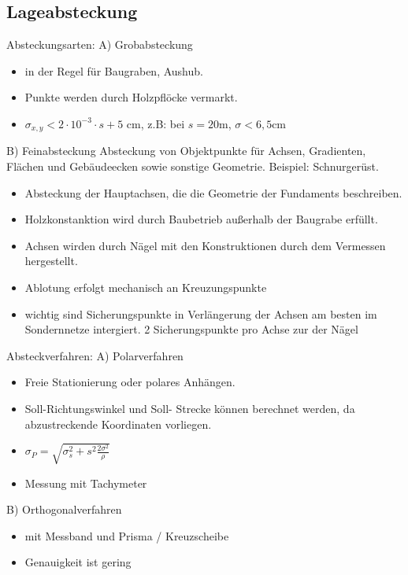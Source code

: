 \documentclass[12pt]{article}
\begin{document}
\subsection{Lageabsteckung}
Absteckungsarten: \newline
A) Grobabsteckung
\begin{itemize}
\item in der Regel für Baugraben, Aushub.
\item Punkte werden durch Holzpflöcke vermarkt.
\item $\sigma_{x,y} < 2 \cdot 10^{-3} \cdot s + 5$ cm, z.B: bei $s=20$m, $\sigma<6,5$cm
\end{itemize}
B) Feinabsteckung \newline
Absteckung von Objektpunkte für Achsen, Gradienten, Flächen und Gebäudeecken sowie sonstige Geometrie. Beispiel: Schnurgerüst.
\begin{itemize}
\item Absteckung der Hauptachsen, die die Geometrie der Fundaments beschreiben. 
\item Holzkonstanktion wird durch Baubetrieb außerhalb der Baugrabe erfüllt.
\item Achsen wirden durch Nägel mit den Konstruktionen durch dem Vermessen hergestellt.
\item Ablotung erfolgt mechanisch an Kreuzungspunkte
\item wichtig sind Sicherungspunkte in Verlängerung der Achsen am besten im Sondernnetze intergiert. 2 Sicherungspunkte pro Achse zur der Nägel
\end{itemize}
Absteckverfahren: \newline
A) Polarverfahren
\begin{itemize}
\item Freie Stationierung oder polares Anhängen.
\item Soll-Richtungswinkel und Soll- Strecke können berechnet werden, da abzustreckende Koordinaten vorliegen.
\item $\sigma_P = \sqrt{\sigma_s^2 + s^2 \frac{2\sigma^2}{\rho}}$
\item Messung mit Tachymeter
\end{itemize}
B) Orthogonalverfahren
\begin{itemize}
\item mit Messband und Prisma / Kreuzscheibe
\item Genauigkeit ist gering
\end{itemize}
\begin{figure*}[ht]\centering
\end{figure*}
\end{document}
